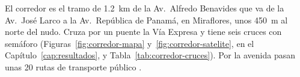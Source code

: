 El corredor es el tramo de 1.2~km de la Av.~Alfredo Benavides que va de
la Av.~José Larco a la Av.~República de Panamá, en Miraflores, unos
450~m al norte del nudo. Cruza por un puente la Vía Expresa y tiene seis
cruces con semáforo (Figuras~\ref{fig:corredor-mapa}
y~\ref{fig:corredor-satelite}, en el Capítulo~\ref{cap:resultados}, y
Tabla~\ref{tab:corredor-cruces}). Por
la avenida pasan unas 20 rutas de transporte público
\citep{Miraflores2017_PMU}.

\begin{table}[!tbp]
\centering
\footnotesize
\setlength{\tabcolsep}{3pt}

\caption[Caso Lima, el corredor: los seis cruces]{Caso Lima, el corredor: los seis cruces con semáforo, de oeste a este. Los carriles y los sentidos salen de OpenStreetMap. Las dos últimas columnas comparan lo que entra a cada cruce en el escenario con el volumen publicado para la hora punta de la mañana.}
\label{tab:corredor-cruces}
\end{table}

